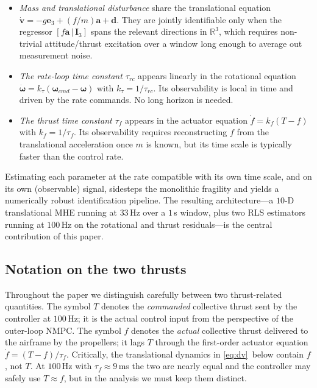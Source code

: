 \documentclass[lettersize,journal]{IEEEtran}
\newcommand{\R}{\mathbb{R}}
\newcommand{\vect}[1]{\bm{#1}}
\newcommand{\mat}[1]{\mathbf{#1}}
\begin{document}
\begin{itemize}
\item \emph{Mass and translational disturbance} share the
translational equation $\dot{\vect v} = -g\vect e_3 + (f/m)\vect a + \vect d$.
They are jointly identifiable only when the regressor
$[f\vect a\,|\,\mat I_3]$ spans the relevant directions in
$\R^3$, which requires non-trivial attitude/thrust excitation over
a window long enough to average out measurement noise.
\item \emph{The rate-loop time constant $\tau_{rc}$} appears
linearly in the rotational equation
$\dot{\vect\omega}=k_\tau(\vect\omega_{cmd}-\vect\omega)$ with
$k_\tau=1/\tau_{rc}$.  Its observability is local in time and
driven by the rate commands.  No long horizon is needed.
\item \emph{The thrust time constant $\tau_f$} appears in the
actuator equation $\dot f = k_f(T-f)$ with $k_f=1/\tau_f$.  Its
observability requires reconstructing $f$ from the translational
acceleration once $m$ is known, but its time scale is typically
faster than the control rate.
\end{itemize}

Estimating each parameter at the rate compatible with its own
time scale, and on its own (observable) signal, sidesteps the
monolithic fragility and yields a numerically robust
identification pipeline.  The resulting architecture---a $10$-D
translational MHE running at $33$\,Hz over a $1$\,s window, plus
two RLS estimators running at $100$\,Hz on the rotational and
thrust residuals---is the central contribution of this paper.

\subsection{Notation on the two thrusts}
Throughout the paper we distinguish carefully between two
thrust-related quantities.  The symbol $T$ denotes the
\emph{commanded} collective thrust sent by the controller at
$100$\,Hz; it is the actual control input from the perspective of
the outer-loop NMPC.  The symbol $f$ denotes the \emph{actual}
collective thrust delivered to the airframe by the propellers;
it lags $T$ through the first-order actuator equation
$\dot f = (T-f)/\tau_f$.  Critically, the translational dynamics
in \eqref{eq:dv}~below contain $f$, not $T$.  At $100$\,Hz with
$\tau_f\approx 9$\,ms the two are nearly equal and the controller
may safely use $T\!\approx\!f$, but in the analysis we must keep
them distinct.
\end{document}
